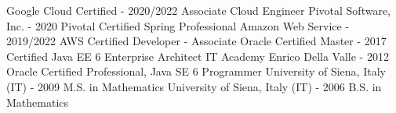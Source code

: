 

\begin{cventries}

  \cventry
    {Google Cloud Certified - 2020/2022}
    {Associate Cloud Engineer}
    {}
    {}
    {}
  \cventry
    {Pivotal Software, Inc. - 2020}
    {Pivotal Certified Spring Professional}
    {}
    {}
    {}
  \cventry
    {Amazon Web Service - 2019/2022}
    {AWS Certified Developer - Associate}
    {}
    {}
    {}
  \cventry
    {Oracle Certified Master - 2017}
    {Certified Java EE 6 Enterprise Architect}
    {}
    {}
    {}
  \cventry
    {IT Academy Enrico Della Valle - 2012}
    {Oracle Certified Professional, Java SE 6 Programmer}
    {}
    {}
    {}
  \cventry
    {University of Siena, Italy (IT) - 2009}
    {M.S. in Mathematics}
    {}
    {}
    {}
  \cventry
    {University of Siena, Italy (IT) - 2006}
    {B.S. in Mathematics}
    {}
    {}
    {}

\end{cventries}
